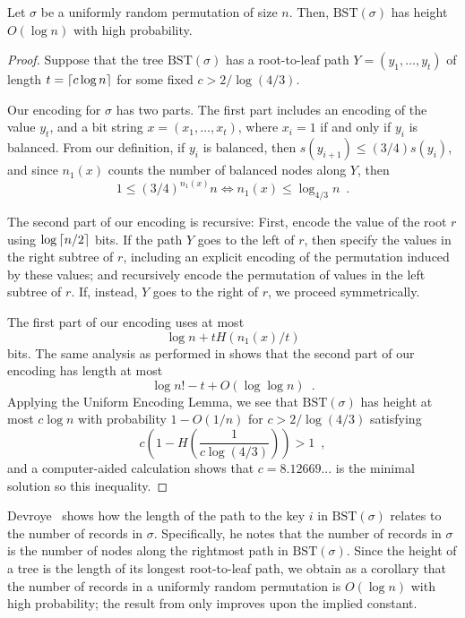 \documentclass{patmorin}
\begin{document}
\begin{thm}
  Let $\sigma$ be a uniformly random permutation of size $n$. Then,
  $\text{BST}(\sigma)$ has height $O(\log n)$ with high probability.
\end{thm}
\begin{proof}
  Suppose that the tree $\text{BST}(\sigma)$ has a root-to-leaf path
  $Y = (y_1, \ldots, y_t)$ of length $t = {\lceil c \log n \rceil}$ for some
  fixed $c > 2/\log (4/3)$.

  Our encoding for $\sigma$ has two parts. The first part includes an
  encoding of the value $y_t$, and a bit string
  $x = (x_1, \ldots, x_t)$, where $x_i = 1$ if and only if $y_i$ is
  balanced. From our definition, if $y_i$ is balanced, then
  $s(y_{i + 1}) \leq (3/4) s(y_i)$, and since $n_1(x)$ counts the
  number of balanced nodes along $Y$, then
  \[
    1 \leq (3/4)^{n_1(x)} n \iff n_1(x) \leq \log_{4/3} n \enspace .
  \]

  The second part of our encoding is recursive: First, encode the
  value of the root $r$ using $\log {\lceil n/2 \rceil}$ bits. If the
  path $Y$ goes to the left of $r$, then specify the values in the
  right subtree of $r$, including an explicit encoding of the
  permutation induced by these values; and recursively encode the
  permutation of values in the left subtree of $r$. If, instead, $Y$
  goes to the right of $r$, we proceed symmetrically.
 
  The first part of our encoding uses at most
  \[
    \log n + t H(n_1(x)/t)
  \]
  bits. The same analysis as performed in  shows that
  the second part of our encoding has length at most
  \[
    \log n! - t + O(\log \log n) \enspace .
  \]
  Applying the Uniform Encoding Lemma, we see that
  $\text{BST}(\sigma)$ has height at most $c \log n$ with probability
  $1 - O(1/n)$ for $c > 2/\log (4/3)$ satisfying
  \[
    c \left(1 - H\left(\frac{1}{c \log (4/3)}\right)\right) > 1 \enspace ,
  \]
  and a computer-aided calculation shows that $c = 8.12669...$ is the
  minimal solution so this inequality.
\end{proof}

\begin{rem}
  Devroye~\cite{devroye:records} shows how the length of the path to
  the key $i$ in $\text{BST}(\sigma)$ relates to the number of records
  in $\sigma$. Specifically, he notes that the number of records in
  $\sigma$ is the number of nodes along the rightmost path in
  $\text{BST}(\sigma)$. Since the height of a tree is the length of
  its longest root-to-leaf path, we obtain as a corollary that the
  number of records in a uniformly random permutation is $O(\log n)$
  with high probability; the result from  only
  improves upon the implied constant.
\end{rem}
\end{document}
